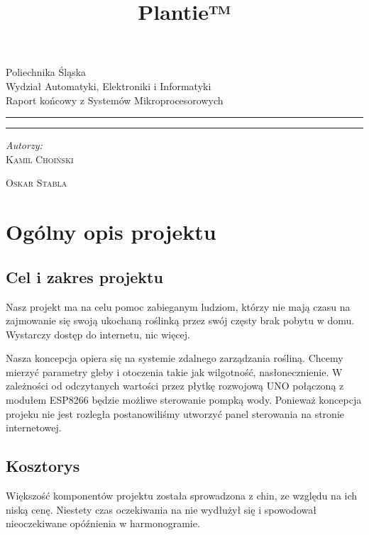 \documentclass[12pt]{article}
\title{Plantie™}
\makeatletter
\newcommand{\linia}{\rule{\linewidth}{0.4mm}}
\renewcommand{\maketitle}{\begin{titlepage}
		\vspace*{1cm}
		\begin{center}\small
			Poliechnika Śląska\\
			Wydział Automatyki, Elektroniki i Informatyki\\
			Raport końcowy z Systemów Mikroprocesorowych
		\end{center}
		\vspace{3cm}
		\noindent\linia
		\begin{center}
			\LARGE \textsc{\@title}
		\end{center}
		\linia
		\vspace{0.5cm}
		\begin{flushright}
			\begin{minipage}{15cm}
				\textit{\small Autorzy:}\\
				\normalsize \textsc{Kamil Choiński} \par \textsc{Oskar Stabla} \par
			\end{minipage}	
		\end{flushright}
		\vspace*{\stretch{6}}
		\begin{center}
			\@date
		\end{center}
	\end{titlepage}
}
\makeatother
\begin{document}
	
\maketitle

\tableofcontents


\section{Ogólny opis projektu}


\subsection{Cel i zakres projektu}
Nasz projekt ma na celu pomoc zabieganym ludziom, którzy nie mają czasu na zajmowanie się
swoją ukochaną roślinką przez swój częsty brak pobytu w domu. Wystarczy dostęp do internetu,
nic więcej.

Nasza koncepcja opiera się na systemie zdalnego zarządzania rośliną. Chcemy mierzyć parametry
gleby i otoczenia takie jak wilgotność, nasłonecznienie. W zależności od odczytanych wartości przez
płytkę rozwojową UNO połączoną z modułem ESP8266 będzie możliwe sterowanie pompką wody. Ponieważ koncepcja projeku nie jest rozległa postanowiliśmy utworzyć panel sterowania na stronie
internetowej.


\subsection{Kosztorys}
Większość komponentów projektu została sprowadzona z chin, ze względu na ich niską cenę. Niestety czas oczekiwania na nie wydłużył się i spowodował nieoczekiwane opóźnienia w harmonogramie.
\end{document}
